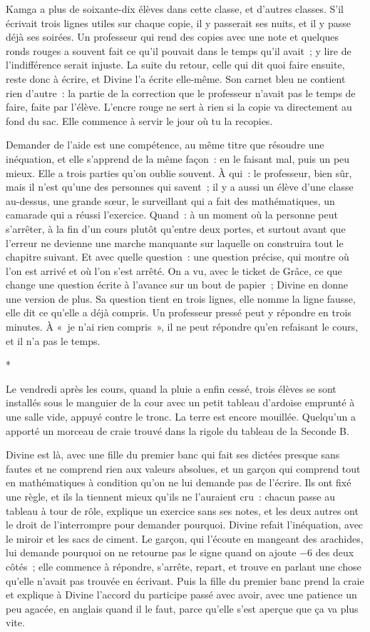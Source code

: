 \documentclass[10.5pt,twoside,openright]{book}
\newcommand{\asterisme}{\par\vspace{0.7em}\centerline{\color{gris}*\quad*\quad*}\vspace{0.7em}\par\noindent}
\begin{document}
Kamga a plus de soixante-dix élèves dans cette classe, et d’autres classes. S’il écrivait trois lignes utiles sur chaque copie, il y passerait ses nuits, et il y passe déjà ses soirées. Un professeur qui rend des copies avec une note et quelques ronds rouges a souvent fait ce qu’il pouvait dans le temps qu’il avait ; y lire de l’indifférence serait injuste. La suite du retour, celle qui dit quoi faire ensuite, reste donc à écrire, et Divine l’a écrite elle-même. Son carnet bleu ne contient rien d’autre : la partie de la correction que le professeur n’avait pas le temps de faire, faite par l’élève. L’encre rouge ne sert à rien si la copie va directement au fond du sac. Elle commence à servir le jour où tu la recopies.

Demander de l’aide est une compétence, au même titre que résoudre une inéquation, et elle s’apprend de la même façon : en le faisant mal, puis un peu mieux. Elle a trois parties qu’on oublie souvent. À qui : le professeur, bien sûr, mais il n’est qu’une des personnes qui savent ; il y a aussi un élève d’une classe au-dessus, une grande sœur, le surveillant qui a fait des mathématiques, un camarade qui a réussi l’exercice. Quand : à un moment où la personne peut s’arrêter, à la fin d’un cours plutôt qu’entre deux portes, et surtout avant que l’erreur ne devienne une marche manquante sur laquelle on construira tout le chapitre suivant. Et avec quelle question : une question précise, qui montre où l’on est arrivé et où l’on s’est arrêté. On a vu, avec le ticket de Grâce, ce que change une question écrite à l’avance sur un bout de papier ; Divine en donne une version de plus. Sa question tient en trois lignes, elle nomme la ligne fausse, elle dit ce qu’elle a déjà compris. Un professeur pressé peut y répondre en trois minutes. À « je n’ai rien compris », il ne peut répondre qu’en refaisant le cours, et il n’a pas le temps.

\asterisme

Le vendredi après les cours, quand la pluie a enfin cessé, trois élèves se sont installés sous le manguier de la cour avec un petit tableau d’ardoise emprunté à une salle vide, appuyé contre le tronc. La terre est encore mouillée. Quelqu’un a apporté un morceau de craie trouvé dans la rigole du tableau de la Seconde B.

Divine est là, avec une fille du premier banc qui fait ses dictées presque sans fautes et ne comprend rien aux valeurs absolues, et un garçon qui comprend tout en mathématiques à condition qu’on ne lui demande pas de l’écrire. Ils ont fixé une règle, et ils la tiennent mieux qu’ils ne l’auraient cru : chacun passe au tableau à tour de rôle, explique un exercice sans ses notes, et les deux autres ont le droit de l’interrompre pour demander pourquoi. Divine refait l’inéquation, avec le miroir et les sacs de ciment. Le garçon, qui l’écoute en mangeant des arachides, lui demande pourquoi on ne retourne pas le signe quand on ajoute −6 des deux côtés ; elle commence à répondre, s’arrête, repart, et trouve en parlant une chose qu’elle n’avait pas trouvée en écrivant. Puis la fille du premier banc prend la craie et explique à Divine l’accord du participe passé avec avoir, avec une patience un peu agacée, en anglais quand il le faut, parce qu’elle s’est aperçue que ça va plus vite.
\end{document}
